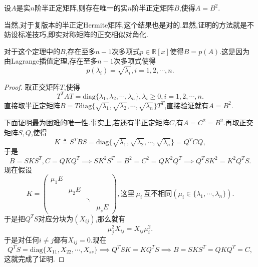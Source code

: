 \documentclass[../../main.tex]{subfiles}%
\begin{document}
\begin{theorem}[半正定矩阵开方唯一]\label{theorem:半正定矩阵开方唯一}
设\( A \)是实\( n \)阶半正定矩阵,则存在唯一的实\( n \)阶半正定矩阵\( B \),使得\( A = B^2 \).
\end{theorem}
\begin{note}
当然,对于复版本的半正定Hermite矩阵,这个结果也是对的.显然,证明的方法就是不妨设标准技巧,即实对称矩阵的正交相似对角化.
\end{note}
\begin{remark}
对于这个定理中的\( B \),存在至多\( n - 1 \)次多项式\( p \in \mathbb{R}[x] \)使得\( B = p(A) \).这是因为由Lagrange插值定理,存在至多\( n - 1 \)次多项式使得
\[
p(\lambda_i) = \sqrt{\lambda_i}, i = 1, 2, \cdots, n.
\]
\end{remark}
\begin{proof}

取正交矩阵\( T \),使得
\[
T^T A T = \text{diag}\{\lambda_1, \lambda_2, \cdots, \lambda_n\}, \lambda_i \geqslant  0, i = 1, 2, \cdots, n.
\]
直接取半正定矩阵\( B = T \text{diag}\{\sqrt{\lambda_1}, \sqrt{\lambda_2}, \cdots, \sqrt{\lambda_n}\} T^T \),直接验证就有\( A = B^2 \).

下面证明最为困难的唯一性.事实上,若还有半正定矩阵\( C \),有\( A = C^2 = B^2 \).再取正交矩阵\( S, Q \),使得
\[
K \triangleq S^T B S = \text{diag}\{\sqrt{\lambda_1}, \sqrt{\lambda_2}, \cdots, \sqrt{\lambda_n}\} = Q^T C Q,
\]
于是
\[
B = S K S^T, C = Q K Q^T \implies S K^2 S^T =B^2=C^2= Q K^2 Q^T \implies Q^T S K^2 = K^2 Q^T S.
\]
现在假设
\[
K = \begin{pmatrix}
\mu_1 E \\
& \mu_2 E \\
& & \ddots \\
& & & \mu_s E
\end{pmatrix}, \text{这里}\ \mu_i\ \text{互不相同}(\mu_i\in \{\lambda_1,\cdots,\lambda_n\}).
\]
于是把\( Q^T S \)对应分块为\( (X_{ij}) \),那么就有
\[
\mu_j^2 X_{ij} = X_{ij} \mu_i^2.
\]
于是对任何\( i \neq j \)都有\( X_{ij} = 0 \).现在
\[
Q^T S = \text{diag}\{X_{11}, X_{22}, \cdots, X_{ss}\} \implies Q^T S K = K Q^T S \implies B = S K S^T = Q K Q^T = C,
\]
这就完成了证明.

\end{proof}
\end{document}
